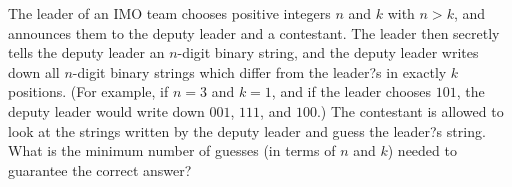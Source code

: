 The leader of an IMO team chooses positive integers $n$ and $k$ with $n>k$, and announces them to the deputy leader and a contestant. The leader then secretly tells the deputy leader an $n$-digit binary string, and the deputy leader writes down all $n$-digit binary strings which differ from the leader?s in exactly $k$ positions. (For example, if $n=3$ and $k=1$, and if the leader chooses $101$, the deputy leader would write down $001$, $111$, and $100$.) The contestant is allowed to look at the strings written by the deputy leader and guess the leader?s string. What is the minimum number of guesses (in terms of $n$ and $k$) needed to guarantee the correct answer?